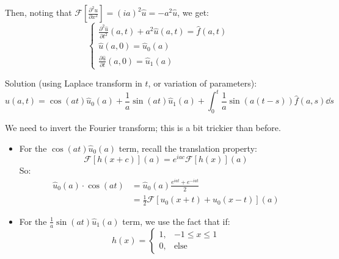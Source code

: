 Then, noting that $\mathcal{F}\left[\frac{\partial^2 u}{\partial x^2}\right] = (ia)^2 \hat{u} = -a^2 \hat{u}$, we get:
\begin{equation}
\begin{cases}
    \displaystyle \frac{\partial^2 \hat{u}}{\partial t^2}(a,t) + a^2 \hat{u}(a,t) = \hat{f}(a,t) \\[2ex]
    \hat{u}(a,0) = \hat{u}_0(a) \\[1ex]
    \displaystyle \frac{\partial \hat{u}}{\partial t}(a,0) = \hat{u}_1(a)
\end{cases}
\end{equation}

Solution (using Laplace transform in $t$, or variation of parameters):
$$ \hat{u}(a,t) = \cos(at) \hat{u}_0(a) + \frac{1}{a}\sin(at) \hat{u}_1(a) + \int_0^t \frac{1}{a} \sin(a(t-s)) \hat{f}(a,s) \dd s $$

We need to invert the Fourier transform; this is a bit trickier than before.

\begin{itemize}
    \item For the $\cos(at)\hat{u}_0(a)$ term, recall the translation property:
    $$ \mathcal{F}[h(x+c)](a) = e^{iac} \mathcal{F}[h(x)](a) $$
    So:
    \begin{align*}
        \hat{u}_0(a) \cdot \cos(at) &= \hat{u}_0(a) \frac{e^{iat} + e^{-iat}}{2} \\
        &= \frac{1}{2} \mathcal{F}[u_0(x+t) + u_0(x-t)](a)
    \end{align*}

    \item For the $\frac{1}{a}\sin(at) \hat{u}_1(a)$ term, we use the fact that if:
    $$ h(x) = \begin{cases} 1, & -1 \leq x \leq 1 \\ 0, & \text{else} \end{cases} $$
\end{itemize}

\begin{center}
\end{center}

